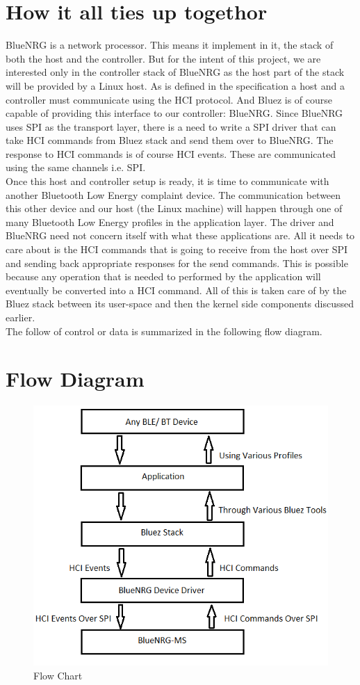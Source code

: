 \section{How it all ties up togethor}
BlueNRG is a network processor. This means it implement in it, the stack of both the host and the controller. But for the intent of this project, we are interested only in the controller stack of BlueNRG as the host part of the stack will be provided by a Linux host. As is defined in the specification a host and a controller must communicate using the HCI protocol. And Bluez is of course capable of providing this interface to our controller: BlueNRG. Since BlueNRG uses SPI as the transport layer, there is a need to write a SPI driver that can take HCI commands from Bluez stack and send them over to BlueNRG. The response to HCI commands is of course HCI events. These are communicated using the same channels i.e. SPI. \\
Once this host and controller setup is ready, it is time to communicate with another Bluetooth Low Energy complaint device. The communication between this other device and our host (the Linux machine) will happen through one of many Bluetooth Low Energy profiles in the application layer. The driver and BlueNRG need not concern itself with what these applications are. All it needs to care about is the HCI commands that is going to receive from the host over SPI and sending back appropriate responses for the send commands. This is possible because any operation that is needed to performed by the application will eventually be converted into a HCI command. All of this is taken care of by the Bluez stack between its user-space and then the kernel side components discussed earlier. \\
The follow of control or data is summarized in the following flow diagram.
\section{Flow Diagram}
\begin{figure}[ht]
	\centering
	\includegraphics[scale=0.5]{images/flow_chart.png}
	\caption{Flow Chart}
\end{figure}
\fi
